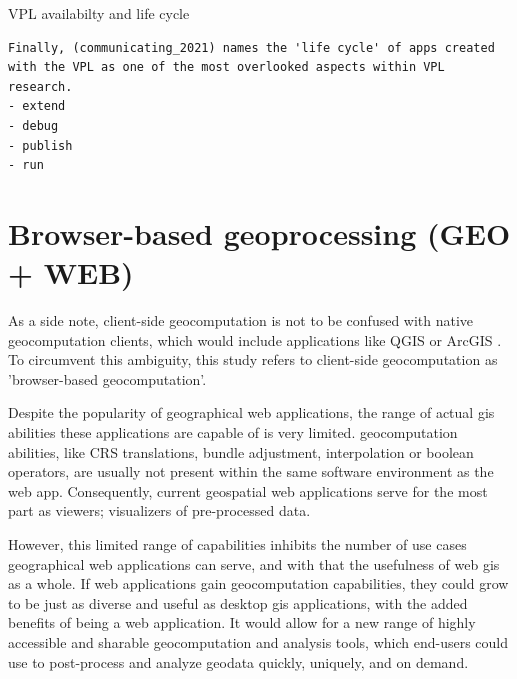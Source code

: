 VPL availabilty and life cycle
\begin{lstlisting}
Finally, (communicating_2021) names the 'life cycle' of apps created 
with the VPL as one of the most overlooked aspects within VPL research. 
- extend 
- debug
- publish
- run
\end{lstlisting}


\section{Browser-based geoprocessing (GEO + WEB)}
\label{sec:related-geoweb}



As a side note, client-side geocomputation is not to be confused with native geocomputation clients, which would include applications like QGIS \cite{qgis_community_qgis_2022}or ArcGIS \cite{esri_arcgis_2022}.
To circumvent this ambiguity, this study refers to client-side geocomputation as 'browser-based geocomputation'.


Despite the popularity of geographical web applications, the range of actual \ac{gis} abilities these applications are capable of is very limited. \ac{geocomputation} abilities, like CRS translations, bundle adjustment, interpolation or boolean operators, are usually not present within the same software environment as the web app. Consequently, current geospatial web applications serve for the most part as viewers; visualizers of pre-processed data. 

However, this limited range of capabilities inhibits the number of use cases geographical web applications can serve, and with that the usefulness of web \ac{gis} as a whole.
If web applications gain \ac{geocomputation} capabilities, they could grow to be just as diverse and useful as desktop \ac{gis} applications, with the added benefits of being a web application. It would allow for a new range of highly accessible and sharable geocomputation and analysis tools, which end-users could use to post-process and analyze geodata quickly, uniquely, and on demand.

